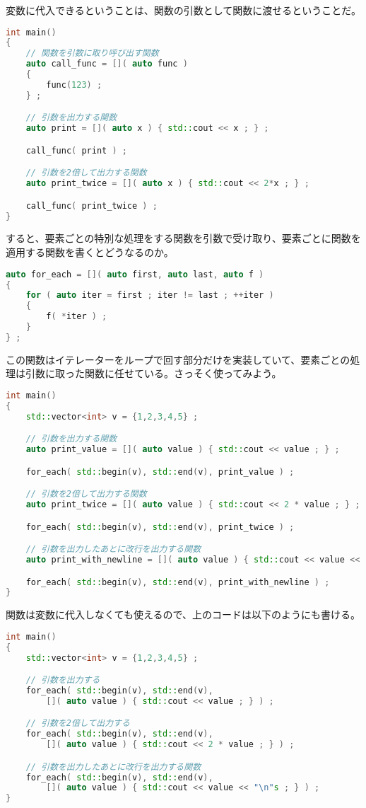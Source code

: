 変数に代入できるということは、関数の引数として関数に渡せるということだ。

\begin{lstlisting}[language={C++}]
int main()
{
    // 関数を引数に取り呼び出す関数
    auto call_func = []( auto func )
    {
        func(123) ;
    } ;

    // 引数を出力する関数
    auto print = []( auto x ) { std::cout << x ; } ;

    call_func( print ) ;

    // 引数を2倍して出力する関数
    auto print_twice = []( auto x ) { std::cout << 2*x ; } ;

    call_func( print_twice ) ;
}
\end{lstlisting}

すると、要素ごとの特別な処理をする関数を引数で受け取り、要素ごとに関数を適用する関数を書くとどうなるのか。

\begin{lstlisting}[language={C++}]
auto for_each = []( auto first, auto last, auto f )
{
    for ( auto iter = first ; iter != last ; ++iter )
    {
        f( *iter ) ;
    }
} ;
\end{lstlisting}

この関数はイテレーターをループで回す部分だけを実装していて、要素ごとの処理は引数に取った関数に任せている。さっそく使ってみよう。

\ifTombow\pagebreak\fi
\begin{lstlisting}[language={C++}]
int main()
{
    std::vector<int> v = {1,2,3,4,5} ;

    // 引数を出力する関数
    auto print_value = []( auto value ) { std::cout << value ; } ;

    for_each( std::begin(v), std::end(v), print_value ) ;

    // 引数を2倍して出力する関数
    auto print_twice = []( auto value ) { std::cout << 2 * value ; } ;

    for_each( std::begin(v), std::end(v), print_twice ) ;

    // 引数を出力したあとに改行を出力する関数
    auto print_with_newline = []( auto value ) { std::cout << value << "\n"s ; } ;

    for_each( std::begin(v), std::end(v), print_with_newline ) ;
}
\end{lstlisting}

関数は変数に代入しなくても使えるので、上のコードは以下のようにも書ける。

\begin{lstlisting}[language={C++}]
int main()
{
    std::vector<int> v = {1,2,3,4,5} ;

    // 引数を出力する
    for_each( std::begin(v), std::end(v),
        []( auto value ) { std::cout << value ; } ) ;

    // 引数を2倍して出力する
    for_each( std::begin(v), std::end(v),
        []( auto value ) { std::cout << 2 * value ; } ) ;

    // 引数を出力したあとに改行を出力する関数
    for_each( std::begin(v), std::end(v),
        []( auto value ) { std::cout << value << "\n"s ; } ) ;
}
\end{lstlisting}

